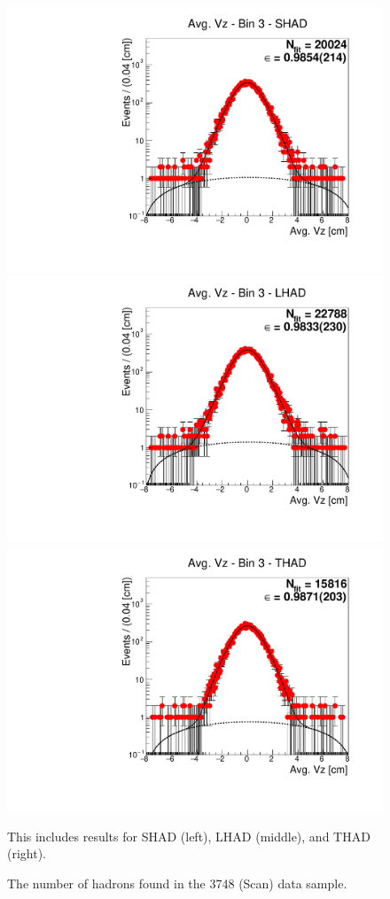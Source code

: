 \begin{figure}[H]
\centering
\includegraphics[scale=0.25]{figures/plots/nonDDbar_fit_results/scan/fit_scan_03_data_SHAD.pdf}
\hspace{-0.5cm}
\includegraphics[scale=0.25]{figures/plots/nonDDbar_fit_results/scan/fit_scan_03_data_LHAD.pdf}
\hspace{-0.5cm}
\includegraphics[scale=0.25]{figures/plots/nonDDbar_fit_results/scan/fit_scan_03_data_THAD.pdf}
\caption{The number of hadrons found in the 3748 (Scan) data sample.}
{This includes results for SHAD (left), LHAD (middle), and THAD (right).}
\label{fig:hadron_fits_scan_03}
\end{figure}

